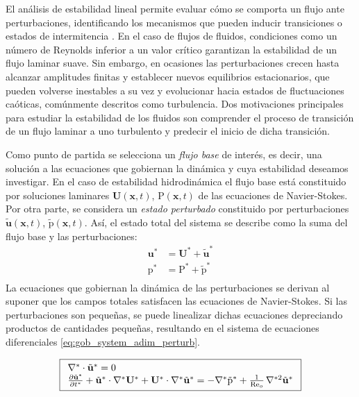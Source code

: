 El análisis de estabilidad lineal permite evaluar cómo se comporta un flujo ante perturbaciones, identificando los mecanismos que pueden inducir transiciones o estados de intermitencia \cite{schmid}. En el caso de flujos de fluidos, condiciones como un número de Reynolds inferior a un valor crítico garantizan la estabilidad de un flujo laminar suave. Sin embargo, en ocasiones las perturbaciones crecen hasta alcanzar amplitudes finitas y establecer nuevos equilibrios estacionarios, que pueden volverse inestables a su vez y evolucionar hacia estados de fluctuaciones caóticas, comúnmente descritos como turbulencia. Dos motivaciones principales para estudiar la estabilidad de los fluidos son comprender el proceso de transición de un flujo laminar a uno turbulento y predecir el inicio de dicha transición.


Como punto de partida se selecciona un \textit{flujo base} de interés, es decir, una solución a las ecuaciones que gobiernan la dinámica y cuya estabilidad deseamos investigar. En el caso de estabilidad hidrodinámica el flujo base está constituido por soluciones laminares $\mathbf{U}(\mathbf{x},t)$, $\text{P}(\mathbf{x},t)$ de las ecuaciones de Navier-Stokes. Por otra parte, se considera un \textit{estado perturbado} constituido por perturbaciones $\tilde{\mathbf{u}}(\mathbf{x},t)$, $\tilde{\text{p}}(\mathbf{x},t)$. Así, el estado total del sistema se describe como la suma del flujo base y las perturbaciones: 
\begin{align}
\mathbf{u^*} &= \mathbf{U^*} + \tilde{\mathbf{u}}^* \\
\text{p}^* &= \text{P}^*+ \tilde{\text{p}}^* \\
\end{align}
La ecuaciones que gobiernan la dinámica de las perturbaciones se derivan al suponer que los campos totales satisfacen las ecuaciones de Navier-Stokes. Si las perturbaciones son pequeñas, se puede linealizar dichas ecuaciones depreciando productos de cantidades pequeñas, resultando en el sistema de ecuaciones diferenciales \ref{eq:gob_system_adim_perturb}.   

\begin{equation}
\boxed{
\begin{array}{l}
    \nabla^* \cdot \tilde{\mathbf{u}}^* = 0 \\
    \frac{\partial \tilde{\mathbf{u}}^*}{\partial t^*} + \tilde{\mathbf{u}}^* \cdot \nabla^* \mathbf{U^*} + \mathbf{U^*} \cdot \nabla^*  \tilde{\mathbf{u}}^* = 
    -\nabla^* \tilde{\text{p}}^* + \frac{1}{\text{Re}_o} \hspace{0.5mm} \nabla^{*2} \tilde{\mathbf{u}}^* \\

\end{array}
}
\label{eq:gob_system_adim_perturb}
\end{equation} 

